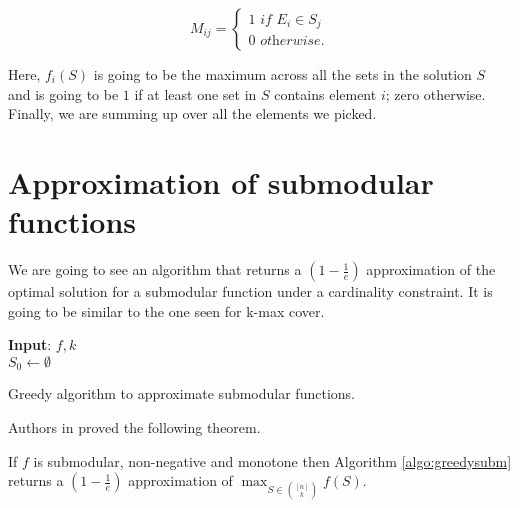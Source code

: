 \begin{equation}
	M_{ij} = \begin{cases}
	1 \textit{ if } E_i \in S_j\\
	0 \textit{ otherwise.}
	\end{cases}
\end{equation}

Here, $f_i(S)$ is going to be the maximum across all the sets in the solution $S$ and is going to be $1$ if at least one set in $S$ contains element $i$; zero otherwise. Finally, we are summing up over all the elements we picked.

\section{Approximation of submodular functions}
We are going to see an algorithm that returns a $\left(1-\frac{1}{e}\right)$ approximation of the optimal solution for a submodular function under a cardinality constraint. It is going to be similar to the one seen for k-max cover.

\begin{algorithm}
	\textbf{Input}: $f, k$\\
	$S_0 \gets \emptyset$\;
	\;
	
	\caption{Greedy algorithm to approximate submodular functions.}
	\label{algo:greedysubm}
\end{algorithm}

Authors in \cite{nemhauser01} proved the following theorem.
\begin{thm}
	If $f$ is submodular, non-negative and monotone then Algorithm \ref{algo:greedysubm}  returns a $\left(1-\frac{1}{e}\right)$ approximation of $\max_{S \in \binom{[n]}{k}} f(S)$.
\end{thm}

